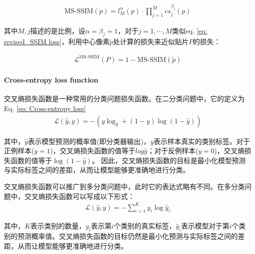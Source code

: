 \documentclass[letterpaper,12pt]{article}
\begin{document}
	\begin{equation}
		\begin{aligned}
			\text{MS-SSIM}(p)=l_{M}^\alpha(p)\cdot \prod_{j=1}^M cs_{j}^{\beta_j}(p)
		\end{aligned}
		\label{eq: MS-SSIM}
	\end{equation}
	
	其中$M,j$描述的是比例，设$\alpha=\beta_j=1$，对于$j={1,\cdots, M}$类似eq. \ref{eq: revised_SSIM loss}，利用中心像素$\tilde{p}$处计算的损失来近似贴片$P$的损失：
	
	\begin{equation}
		\begin{aligned}
			\mathcal{L}^{\text{MS-SSIM}}(P)=1-\text{MS-SSIM}(\tilde{p})
		\end{aligned}
		\label{eq: MS-SSIM loss}
	\end{equation}
	
	\paragraph{Cross-entropy loss function}
	
	交叉熵损失函数是一种常用的分类问题损失函数。在二分类问题中，它的定义为Eq. \ref{eq: Cross-entropy loss}
	\begin{equation}
		\begin{aligned}
			\mathcal{L}(\hat{y},y)=-\left( y\log_{\hat{y}} + (1-y) \log (1-\hat{y}) \right)
		\end{aligned}
		\label{eq: Cross-entropy loss}
	\end{equation}
	
	其中，$\hat{y}$表示模型预测的概率值(即分类器输出)，$y$表示样本真实的类别标签。对于正例样本($y=1$)，交叉熵损失函数的值等于$log {\hat{y}}$；对于反例样本($y=0$)，交叉熵损失函数的值等于$\log (1-\hat{y})$。 因此，交叉熵损失函数的目标是最小化模型预测与实际标签之间的差距，从而让模型能够更准确地进行分类。 
	
	交叉熵损失函数可以推广到多分类问题中，此时它的表达式略有不同。在多分类问题中，交叉熵损失函数可以写成以下形式： 
	\begin{equation}
		\begin{aligned}
			\mathcal{L}(\hat{y},y)=-\sum_{i=1}^K y_i \log \hat{y}_i
		\end{aligned}
		\label{eq: revised_Cross-entropy loss}
	\end{equation} 
	
	其中，$K$表示类别的数量，$y_i$表示第$i$个类别的真实标签，$\hat{y}_i$表示模型对于第$i$个类别的预测概率值。交叉熵损失函数的目标仍然是最小化预测与实际标签之间的差距，从而让模型能够更准确地进行分类。
	
\end{document}
